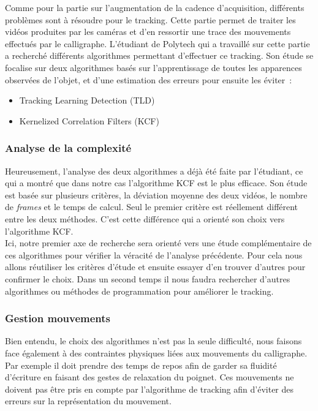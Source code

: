 Comme pour la partie sur l'augmentation de la cadence d'acqui\-si\-tion, dif\-fé\-rents problèmes sont à résoudre pour le tracking. Cette partie permet de traiter les vidéos produites par les caméras et d'en ressortir une trace des mouvements effectués par le calligraphe. L'étudiant de Polytech qui a travaillé sur cette partie a recherché différents algorithmes permettant d'effectuer ce tracking. Son étude se focalise sur deux algorithmes basés sur l'apprentissage de toutes les apparences observées de l'objet, et d'une estimation des erreurs pour ensuite les éviter~:

\begin{itemize}

\item Tracking Learning Detection (TLD)

\item Kernelized Correlation Filters (KCF)

\end{itemize}

  
\subsubsection{Analyse de la complexité}

Heureusement, l'analyse des deux al\-go\-ri\-thmes a déjà été faite par l'é\-tu\-diant, ce qui a montré que dans notre cas l'al\-go\-ri\-thme KCF est le plus ef\-fi\-ca\-ce. Son étude est basée sur plusieurs critères, la déviation moyenne des deux vidéos, le nombre de \textit{frames} et le temps de calcul. Seul le premier critère est ré\-el\-le\-ment différent entre les deux méthodes. C'est cette différence qui a orienté son choix vers l'algorithme KCF. \\

Ici, notre premier axe de recherche sera orienté vers une étude com\-plé\-men\-tai\-re de ces algorithmes pour vérifier la véracité de l'analyse précédente. Pour cela nous allons réutiliser les critères d'étude et ensuite essayer d'en trouver d'autres pour confirmer le choix. Dans un second temps il nous faudra rechercher d'autres algorithmes ou méthodes de programmation pour améliorer le tracking.

\subsubsection{Gestion mouvements}

Bien entendu, le choix des algorithmes n'est pas la seule difficulté, nous faisons face également à des contraintes physiques liées aux mouvements du calligraphe. Par exemple il doit prendre des temps de repos afin de garder sa fluidité d'écriture en faisant des gestes de relaxation du poignet. Ces mouvements ne doivent pas être pris en compte par l'algorithme de tracking afin d'éviter des erreurs sur la représentation du mouvement. \\

